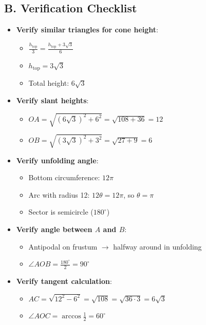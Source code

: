 \documentclass[12pt]{article}
\begin{document}
\begin{verificationbox}
\subsection*{B. Verification Checklist}
\begin{itemize}[leftmargin=*]
    \item \textbf{Verify similar triangles for cone height}:
    \begin{itemize}
        \item $\frac{h_{\text{top}}}{3} = \frac{h_{\text{top}} + 3\sqrt{3}}{6}$ \checkmark
        \item $h_{\text{top}} = 3\sqrt{3}$ \checkmark
        \item Total height: $6\sqrt{3}$ \checkmark
    \end{itemize}
    \item \textbf{Verify slant heights}:
    \begin{itemize}
        \item $OA = \sqrt{(6\sqrt{3})^2 + 6^2} = \sqrt{108 + 36} = 12$ \checkmark
        \item $OB = \sqrt{(3\sqrt{3})^2 + 3^2} = \sqrt{27 + 9} = 6$ \checkmark
    \end{itemize}
    \item \textbf{Verify unfolding angle}:
    \begin{itemize}
        \item Bottom circumference: $12\pi$
        \item Arc with radius 12: $12\theta = 12\pi$, so $\theta = \pi$ \checkmark
        \item Sector is semicircle ($180^\circ$) \checkmark
    \end{itemize}
    \item \textbf{Verify angle between $A$ and $B$}:
    \begin{itemize}
        \item Antipodal on frustum $\to$ halfway around in unfolding
        \item $\angle AOB = \frac{180^\circ}{2} = 90^\circ$ \checkmark
    \end{itemize}
    \item \textbf{Verify tangent calculation}:
    \begin{itemize}
        \item $AC = \sqrt{12^2 - 6^2} = \sqrt{108} = \sqrt{36 \cdot 3} = 6\sqrt{3}$ \checkmark
        \item $\angle AOC = \arccos\frac{1}{2} = 60^\circ$ \checkmark
    \end{itemize}

\end{itemize}
\end{verificationbox}
\end{document}
